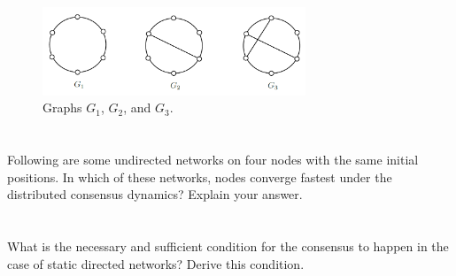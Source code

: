 \documentclass[]{article}
\numberwithin{equation}{section}
\begin{document}
\begin{figure}[h]
	\centering
	\includegraphics[width=0.7\textwidth]{figs/pblm6.png}
	\caption{Graphs $G_1$, $G_2$, and $G_3$.}
	\label{fig:pblm6}
\end{figure}










\section{}
Following are some undirected networks on four nodes with the same initial positions.
In which of these networks, nodes converge fastest under the distributed consensus dynamics? 
Explain your answer.













\section{}
What is the necessary and sufficient condition for the consensus to happen in the case of static directed networks? 
Derive this condition.


















\end{document}

